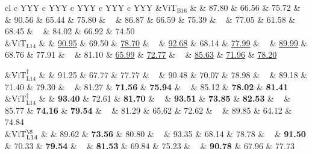 \begin{table*}[!htbp]
\begin{tabularx}{\textwidth}{cl c YYY c YYY c YYY c YYY c YYY}
&{ViT$_{\text{B16}}$} &  & 
87.80 & 66.56 & 75.72  & ~ &
90.56 & 65.44 & 75.80  & ~ &
86.87 & 66.59 & 75.39  & ~ &
77.05 & 61.58 & 68.45  & ~ &
84.02 & 66.92 & 74.50  \\

&{ViT$_{\text{L14}}$} &  & 
\underline{90.95} & 69.50 & \underline{78.70}  & ~ &
\underline{92.68} & 68.14 & \underline{77.99}  & ~ &
\underline{89.99} & 68.76 & 77.91  & ~ &
81.10 & \underline{65.99} & \underline{72.77}  & ~ &
\underline{85.63} & \underline{71.96} & \underline{78.20}  \\

{}

&{ViT$_{\text{L14}}^\dag$} &  & 
91.25 & 67.77 & 77.77  & ~ &
90.48 & 70.07 & 78.98  & ~ &
89.18 & 71.40 & 79.30  & ~ &
81.27 & \textbf{71.56} & \textbf{75.94}  & ~ &
85.12 & \textbf{78.02} & \textbf{81.41}  \\

&{ViT$_{\text{L14}}^\ddag$} &  & 
\textbf{93.40} & 72.61 & \textbf{81.70}  & ~ &
\textbf{93.51} & \textbf{73.85} & \textbf{82.53}  & ~ &
85.77 & \textbf{74.16} & \textbf{79.54}  & ~ &
81.29 & 65.62 & 72.62  & ~ &
89.85 & 64.12 & 74.84  \\

&{ViT$_{\text{L14}}^\S$} &  & 
89.62 & \textbf{73.56} & 80.80  & ~ &
93.35 & 68.14 & 78.78  & ~ &
\textbf{91.50} & 70.33 & \textbf{79.54}  & ~ &
\textbf{81.53} & 69.84 & 75.23  & ~ &
\textbf{90.78} & 67.96 & 77.73  \\

\bottomrule
\end{tabularx}
\caption{Results of Generative and Disentanglement Based Methods for the CUB, SUN and AWA2 datasets using different features extracted from different size and architecture of the visual head from diverse CLIP models (i.e., Resnet50 (R50) and Vision Transformer (ViT)). The three bottom rows per section correspond to fine-tuned features using sentences with: $\dag$ the class names, $\ddag$ the attributes, and $\S$ both class names and attributes. The bold numbers correspond to the highest scores per column, the underline numbers correspond to the to the highest scores using features not fine-tuned, and the shaded rows correspond to the most performant image feature per method over all. Surprisingly, the most performant method for all datasets correspond to a \textit{generative} based method.
}
\label{tab:gzsl_using_clip_features_full}
\end{table*}